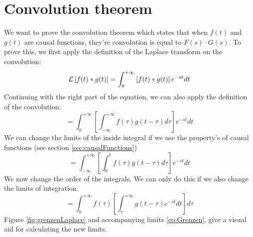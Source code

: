 \documentclass[]{subfiles}
\begin{document}
	\section{Convolution theorem}
	We want to prove the convolution theorem which states that when $f(t)$ and $g(t)$ are causal functions, they're convolution is equal to $F(s)\cdot G(s)$. To prove this, we first apply the definition of the Laplace transform on the convolution:
	\begin{equation}
		\mathcal{L}\left[ f(t)\ast g(t)\right]  = \int_{0}^{+\infty}\left[ f(t)\ast g(t)\right] e^{-st}dt
	\end{equation}
	Continuing with the right part of the equation, we can also apply the definition of the convolution:
	\begin{equation}
		=\int_{0}^{+\infty}\left[ \int_{-\infty}^{+\infty}f(\tau)g(t-\tau)d\tau	\right] e^{-st}dt
	\end{equation}
	We can change the limits of the inside integral if we use the property's of causal functions (see section \ref{sec:causalFunctions})
	\begin{equation}
		=\int_{-\infty}^{+\infty}\left[ \int_{0}^{t}f(\tau)g(t-\tau)d\tau\right] e^{-st}dt
	\end{equation}
	We now change the order of the integrals. We can only do this if we also change the limits of integration.
	\begin{equation}
		=\int_{0}^{+\infty}f(\tau)\left[ \int_{\tau}^{+\infty}g(t-\tau)e^{-st}dt\right] d\tau
	\end{equation}
	Figure \ref{fig:grenzenLaplace} and accompanying limits  \ref{eq:Grenzen}, give a visual aid for calculating the new limits.
\end{document}
